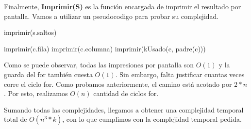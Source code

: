 Finalmente, \textbf{Imprimir(S)} es la función encargada de imprimir el resultado por pantalla. Vamos a utilizar un pseudocodigo para probar su complejidad.

\begin{pseudo}
        \State imprimir(s.saltos) 

		 
        \State imprimir(c.fila) 
        \State imprimir(c.columna) 
        \State imprimir(kUsado(c, padre(c))) 
      	\EndFor
        
    \EndProcedure
\end{pseudo}

Como se puede observar, todas las impresiones por pantalla son $O(1)$ y la guarda del for también cuesta $O(1)$. Sin embargo, falta justificar cuantas veces corre el ciclo for. Como probamos anteriormente, el camino está acotado por $2*n$. Por esto, realizamos $O(n)$ cantidad de ciclos for.

Sumando todas las complejidades, llegamos a obtener una complejidad temporal total de $O(n^3 * k)$, con lo que cumplimos con la complejidad temporal pedida.